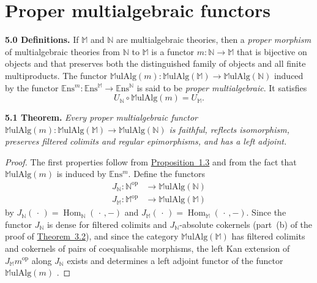 \documentclass{article}
\newenvironment{itenv}[1]
  {\phantomsection\par\medskip\noindent\textbf{#1.}\itshape}
  {\par\medskip}
\newenvironment{rmenv}[1]
  {\phantomsection\par\medskip\noindent\textbf{#1.}\rmfamily}
  {\par\medskip}
\newcommand{\bb}[1]{{\mathbb{#1}}}
\newcommand{\op}{{\mathrm{op}}}
\newcommand{\Set}{\mathbb{E}\mathrm{ns}}
\newcommand{\MulAlg}{\mathbb{M}\mathrm{ulAlg}}
\DeclareMathOperator{\Hom}{Hom}
\newcommand{\oldpage}[1]{\marginpar{\footnotesize$\Big\vert$ \textit{p.~#1}}}
\begin{document}
\section{Proper multialgebraic functors}
\label{5}

\begin{rmenv}{5.0 Definitions}
\label{5.0}
  If $\bb{M}$ and $\bb{N}$ are multialgebraic theories, then a \emph{proper morphism} of multialgebraic theories from $\bb{N}$ to $\bb{M}$ is a functor $m\colon\bb{N}\to\bb{M}$ that is bijective on objects and that preserves both the distinguished family of objects and all finite multiproducts.
  The functor $\MulAlg(m)\colon\MulAlg(\bb{M})\to\MulAlg(\bb{N})$ induced by the
\oldpage{206}
  functor $\Set^m\colon\Set^\bb{M}\to\Set^\bb{N}$ is said to be \emph{proper multialgebraic}.
  It satisfies
  \[
    U_\bb{N}\circ\MulAlg(m) = U_\bb{M}.
  \]
\end{rmenv}

\begin{itenv}{5.1 Theorem}
\label{5.1}
  Every proper multialgebraic functor $\MulAlg(m)\colon\MulAlg(\bb{M})\to\MulAlg(\bb{N})$ is faithful, reflects isomorphism, preserves filtered colimits and regular epimorphisms, and has a left adjoint.
\end{itenv}

\begin{proof}
  The first properties follow from \hyperref[1.3]{Proposition~1.3} and from the fact that $\MulAlg(m)$ is induced by $\Set^m$.
  Define the functors
  \[
    \begin{aligned}
      J_\bb{N}\colon \bb{N}^\op &\to \MulAlg(\bb{N})
    \\J_\bb{M}\colon \bb{M}^\op &\to \MulAlg(\bb{M})
    \end{aligned}
  \]
  by $J_\bb{N}(\,\cdot\,)=\Hom_\bb{N}(\,\cdot\,,-)$ and $J_\bb{M}(\,\cdot\,)=\Hom_\bb{M}(\,\cdot\,,-)$.
  Since the functor $J_\bb{N}$ is dense for filtered colimits and $J_\bb{N}$-absolute cokernels (part~(b) of the proof of \hyperref[3.2]{Theorem~3.2}), and since the category $\MulAlg(\bb{M})$ has filtered colimits and cokernels of pairs of coequalisable morphisms, the left Kan extension of $J_\bb{M}m^\op$ along $J_\bb{N}$ exists and determines a left adjoint functor of the functor $\MulAlg(m)$ \cite[Prop.~3.1]{4}.
\end{proof}
\end{document}
